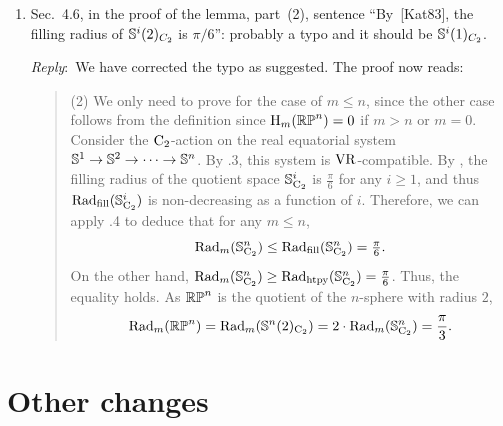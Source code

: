 \documentclass{amsart}
\newcommand{\ar}{\medskip\noindent\textit{Reply}:\ }
\begin{document}
\begin{enumerate}
		\ar Added ``the round sphere of radius 1'' to this sentence:
		We will consider every sphere \(\bS^n(2)\) to have radius 2 so the quotient \(\rp^n\) has the same diameter as \(\bS^n\), the round sphere of radius 1.

		Added ``Lens space'' to this sentence:
		We are interested in spheres \(\bS^{2n+1}(q)\) of radius \(q\), so the quotient Lens space \(\rL_q^n\) has the same diameter as the unit sphere \(\bS^{2n+1}\).

		\item Sec.~4.6, in the proof of the lemma, part~(2), sentence ``By~[Kat83], the filling radius of $\mathbb{S}^i(2)_{C_2}$ is $\pi/6$'': probably a typo and it should be $\mathbb{S}^i(1)_{C_2}$.

		\ar We have corrected the typo as suggested. The proof now reads:

		\smallskip

		\begin{quote}
			(2) We only need to prove for the case of $m\leq n$, since the other case follows from the definition since \(\mathrm{H}_m(\mathbb{RP}^n) = 0\) if \(m > n\) or \(m = 0\).
			Consider the \(\mathrm{C}_2\)-action on the real equatorial system \(\mathbb{S}^{1} \to \mathbb{S}^{2} \to \dotsb \to \mathbb{S}^{n}\).
			By .3, this system is \(\mathrm{VR}\)-compatible.
			By \cite{katz1983filling}, the filling radius of the quotient space $\mathbb{S}^{i}_{\mathrm{C}_2}$ is $\frac{\pi}{6}$ for any $i \geq 1$, and thus $\mathrm{Rad}_{\mathrm{fill}}(\mathbb{S}^{i}_{\mathrm{C}_2})$ is non-decreasing as a function of \(i\).
			Therefore, we can apply .4 to deduce that for any \(m \leq n\),
			\[
			\mathrm{Rad}_{m}(\mathbb{S}^{n}_{\mathrm{C}_2}) \leq \mathrm{Rad}_{\mathrm{fill}}(\mathbb{S}^{n}_{\mathrm{C}_2}) = \tfrac{\pi}{6}.
			\]
			On the other hand, $\mathrm{Rad}_{m}(\mathbb{S}^{n}_{\mathrm{C}_2})\geq \mathrm{Rad}_{\mathrm{htpy}}(\mathbb{S}^{n}_{\mathrm{C}_2}) = \tfrac{\pi}{6}$.
			Thus, the equality holds.
			As $\rp^n$ is the quotient of the $n$-sphere with radius $2$,
			\[\mathrm{Rad}_{m}(\mathbb{RP}^n) = \mathrm{Rad}_{m}(\mathbb{S}^{n}(2)_{\mathrm{C}_2}) = 2\cdot \mathrm{Rad}_{m}(\mathbb{S}^{n}_{\mathrm{C}_2}) = \frac{\pi}{3}.\]
		\end{quote}
	\end{enumerate}

	\section{Other changes}
\end{document}
